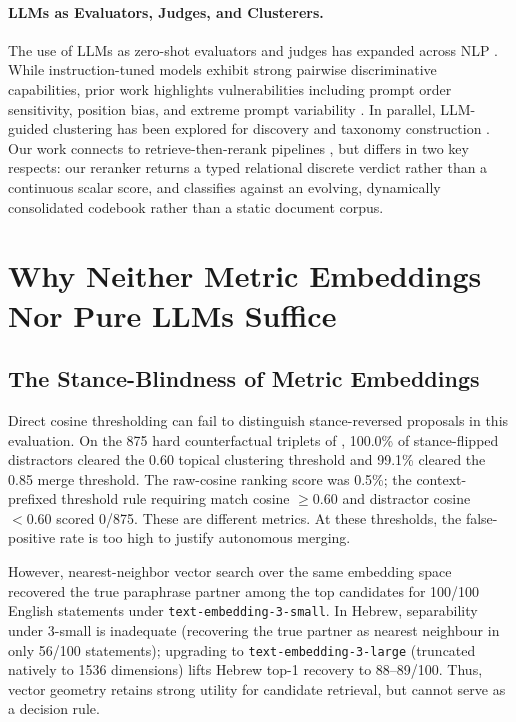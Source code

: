 \documentclass[11pt,a4paper]{article}
\begin{document}
\paragraph{LLMs as Evaluators, Judges, and Clusterers.} The use of LLMs as zero-shot evaluators and judges has expanded across NLP \citep{zheng2023judging}. While instruction-tuned models exhibit strong pairwise discriminative capabilities, prior work highlights vulnerabilities including prompt order sensitivity, position bias, and extreme prompt variability \citep{wang2023large,sclar2024quantifying,liu2024lost}. In parallel, LLM-guided clustering has been explored for discovery and taxonomy construction \citep{zhang2023clusterllm,viswanathan2024large}. Our work connects to retrieve-then-rerank pipelines \citep{nogueira2019passage,lewis2020retrieval}, but differs in two key respects: our reranker returns a typed relational discrete verdict rather than a continuous scalar score, and classifies against an evolving, dynamically consolidated codebook rather than a static document corpus.

\section{Why Neither Metric Embeddings Nor Pure LLMs Suffice}

\subsection{The Stance-Blindness of Metric Embeddings}

Direct cosine thresholding can fail to distinguish stance-reversed proposals in this evaluation. On the 875 hard counterfactual triplets of \citet{blair2026embeddings}, 100.0\% of stance-flipped distractors cleared the 0.60 topical clustering threshold and 99.1\% cleared the 0.85 merge threshold. The raw-cosine ranking score was 0.5\%; the context-prefixed threshold rule requiring match cosine $\geq0.60$ and distractor cosine $<0.60$ scored 0/875. These are different metrics. At these thresholds, the false-positive rate is too high to justify autonomous merging.

However, nearest-neighbor vector search over the same embedding space recovered the true paraphrase partner among the top candidates for 100/100 English statements under \texttt{text-embedding-3-small}. In Hebrew, separability under 3-small is inadequate (recovering the true partner as nearest neighbour in only 56/100 statements); upgrading to \texttt{text-embedding-3-large} (truncated natively to 1536 dimensions) lifts Hebrew top-1 recovery to 88--89/100. Thus, vector geometry retains strong utility for candidate retrieval, but cannot serve as a decision rule.
\end{document}
